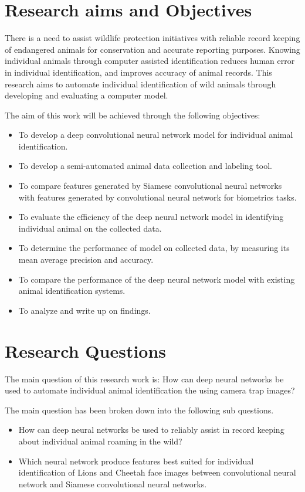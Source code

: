 \section{Research  aims  and Objectives}
There is a need to assist wildlife protection initiatives with reliable record keeping of endangered animals for conservation and accurate reporting purposes. Knowing individual animals through computer assisted identification reduces human error in individual identification, and improves accuracy of animal records. This research aims to automate individual identification of wild animals through developing and evaluating a computer model. 

The aim of this work will be achieved through the following objectives: 

\begin{itemize}

    \item To develop a deep convolutional neural network model for individual animal identification.
    \item To develop a semi-automated animal data collection and labeling tool.
    \item To compare features generated by Siamese convolutional neural networks with features generated by convolutional neural network for biometrics tasks.   
    \item To evaluate the efficiency of the deep neural network model in identifying individual animal on the collected data.
    \item To determine the performance of model on collected data, by measuring its mean average precision and accuracy. 
    \item To compare the performance of the deep neural network model with existing animal identification systems. 
    \item To analyze and write up on findings.  
\end{itemize}
\section{Research Questions}
The main question of this research work is: 
How can deep neural networks be used to automate individual animal identification the using camera trap images?

The main question has been broken down into the following sub questions.
\begin{itemize}
    \item How can deep neural networks be used to reliably assist in record keeping about individual animal roaming in the wild?
    \item Which neural network produce features best suited for individual identification of Lions and Cheetah face images between convolutional neural network and Siamese convolutional neural networks.      
\end{itemize}

